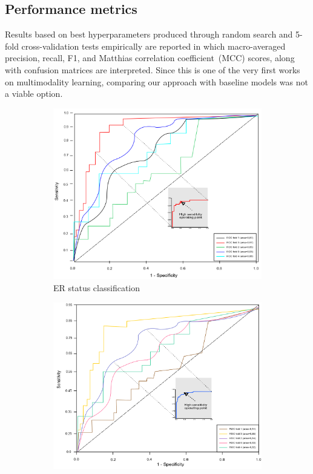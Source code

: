 \subsection{Performance metrics}
Results based on best hyperparameters produced through random search and 5-fold cross-validation tests empirically are reported in which macro-averaged precision, recall, F1, and Matthias correlation coefficient~(MCC) scores, along with confusion matrices are interpreted. Since this is one of the very first works on multimodality learning, comparing our approach with baseline models was not a viable option. 
\iffalse
\begin{figure}
	\centering
	\begin{subfigure}{.49\linewidth}
		\centering
		\includegraphics[width=0.9\linewidth]{images/roc_er.png}
		\caption{ER status classification}
        \label{fig:er_roc}
	\end{subfigure}
	\begin{subfigure}{.49\linewidth}
		\centering
		\includegraphics[width=0.9\linewidth]{images/roc_pgr.png}

\end{subfigure}
\end{figure}
